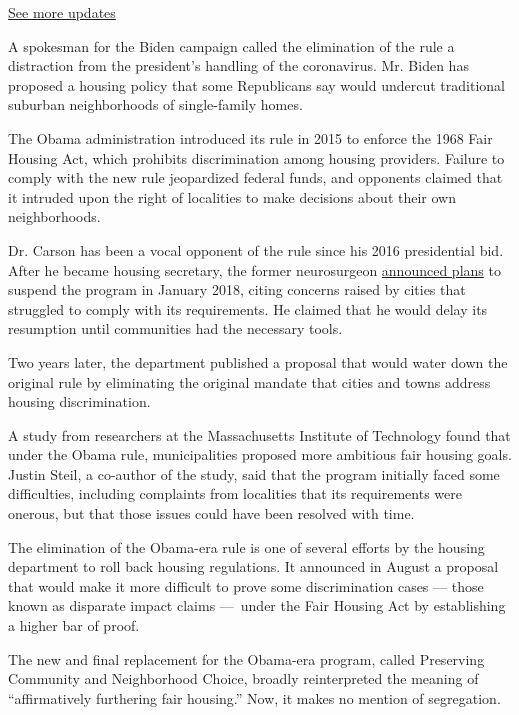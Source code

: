 \href{https://www.nytimes.com/2020/07/31/us/elections/biden-vs-trump.html?action=click\&pgtype=Article\&state=default\&region=MAIN_CONTENT_1\&context=storylines_live_updates}{See
more updates}

A spokesman for the Biden campaign called the elimination of the rule a
distraction from the president's handling of the coronavirus. Mr. Biden
has proposed a housing policy that some Republicans say would undercut
traditional suburban neighborhoods of single-family homes.

The Obama administration introduced its rule in 2015 to enforce the 1968
Fair Housing Act, which prohibits discrimination among housing
providers. Failure to comply with the new rule jeopardized federal
funds, and opponents claimed that it intruded upon the right of
localities to make decisions about their own neighborhoods.

Dr. Carson has been a vocal opponent of the rule since his 2016
presidential bid. After he became housing secretary, the former
neurosurgeon
\href{https://www.nytimes.com/2018/01/04/upshot/trump-delays-hud-fair-housing-obama-rule.html}{announced
plans} to suspend the program in January 2018, citing concerns raised by
cities that struggled to comply with its requirements. He claimed that
he would delay its resumption until communities had the necessary tools.

Two years later, the department published a proposal that would water
down the original rule by eliminating the original mandate that cities
and towns address housing discrimination.

A study from researchers at the Massachusetts Institute of Technology
found that under the Obama rule, municipalities proposed more ambitious
fair housing goals. Justin Steil, a co-author of the study, said that
the program initially faced some difficulties, including complaints from
localities that its requirements were onerous, but that those issues
could have been resolved with time.

The elimination of the Obama-era rule is one of several efforts by the
housing department to roll back housing regulations. It announced in
August a proposal that would make it more difficult to prove some
discrimination cases --- those known as disparate impact claims
---~under the Fair Housing Act by establishing a higher bar of proof.

The new and final replacement for the Obama-era program, called
Preserving Community and Neighborhood Choice, broadly reinterpreted the
meaning of ``affirmatively furthering fair housing.'' Now, it makes no
mention of segregation.

